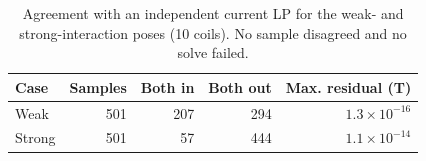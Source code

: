\begin{table}[t]
\centering\small
\caption{Agreement with an independent current LP for the weak- and strong-interaction poses (10 coils). No sample disagreed and no solve failed.}
\label{tab: afw verification}
\setlength{\tabcolsep}{4pt}
\begin{tabular}{lrrrr}
\toprule
Case & Samples & Both in & Both out & Max. residual (T) \\
\midrule
Weak & 501 & 207 & 294 & $1.3\times10^{-16}$ \\
Strong & 501 & 57 & 444 & $1.1\times10^{-14}$ \\
\bottomrule
\end{tabular}
\end{table}
